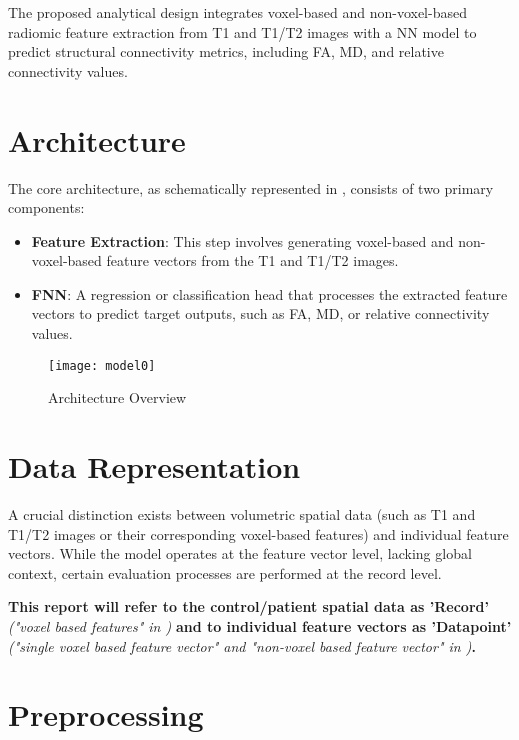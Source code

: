 The proposed analytical design integrates voxel-based and non-voxel-based radiomic feature extraction from T1 and T1/T2 images with a \ac{NN} model to predict structural connectivity metrics, including \ac{FA}, \ac{MD}, and relative connectivity values.

\section{Architecture}

The core architecture, as schematically represented in , consists of two primary components:
\begin{itemize}
\item \textbf{Feature Extraction}: This step involves generating voxel-based and non-voxel-based feature vectors from the T1 and T1/T2 images.
\item \textbf{\ac{FNN}}: A regression or classification head that processes the extracted feature vectors to predict target outputs, such as \ac{FA}, \ac{MD}, or relative connectivity values.
\end{itemize}

\begin{figure}[H]
\centering
\texttt{[image: model0]}
\caption{Architecture Overview}
\label{fig:model0}
\end{figure}

\section{Data Representation}

A crucial distinction exists between volumetric spatial data (such as T1 and T1/T2 images or their corresponding voxel-based features) and individual feature vectors. While the model operates at the feature vector level, lacking global context, certain evaluation processes are performed at the record level.\par
\textbf{This report will refer to the control/patient spatial data as 'Record'} \emph{("voxel based features" in )} \textbf{and to individual feature vectors as 'Datapoint'} \emph{("single voxel based feature vector" and "non-voxel based feature vector" in )}\textbf{.}

\section{Preprocessing}
\label{sec:preproc}

